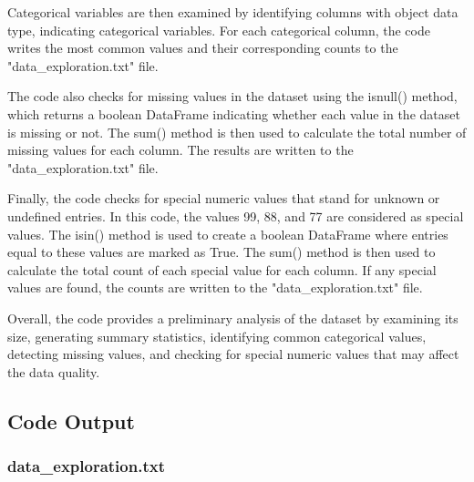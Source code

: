 \documentclass[11pt]{article}
\begin{document}
Categorical variables are then examined by identifying columns with object data type, indicating categorical variables. For each categorical column, the code writes the most common values and their corresponding counts to the "data\_exploration.txt" file.

The code also checks for missing values in the dataset using the isnull() method, which returns a boolean DataFrame indicating whether each value in the dataset is missing or not. The sum() method is then used to calculate the total number of missing values for each column. The results are written to the "data\_exploration.txt" file.

Finally, the code checks for special numeric values that stand for unknown or undefined entries. In this code, the values 99, 88, and 77 are considered as special values. The isin() method is used to create a boolean DataFrame where entries equal to these values are marked as True. The sum() method is then used to calculate the total count of each special value for each column. If any special values are found, the counts are written to the "data\_exploration.txt" file.

Overall, the code provides a preliminary analysis of the dataset by examining its size, generating summary statistics, identifying common categorical values, detecting missing values, and checking for special numeric values that may affect the data quality.

\subsection{Code Output}

\subsubsection*{data\_exploration.txt}
\end{document}
